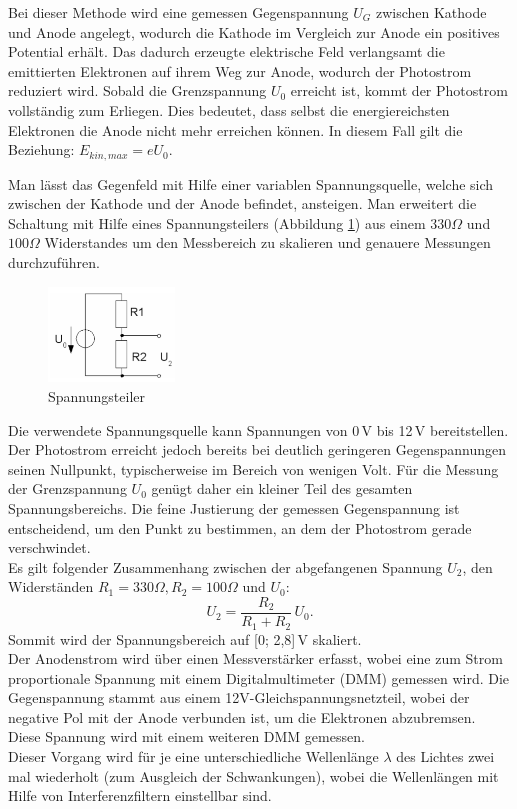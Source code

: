 Bei dieser Methode wird eine gemessen Gegenspannung $U_G$ zwischen Kathode und Anode angelegt, wodurch die Kathode im Vergleich zur Anode ein positives Potential erhält.
Das dadurch erzeugte elektrische Feld verlangsamt die emittierten Elektronen auf ihrem Weg zur Anode, wodurch der Photostrom reduziert wird. Sobald die Grenzspannung $U_0$ erreicht ist, kommt der Photostrom vollständig zum Erliegen. 
Dies bedeutet, dass selbst die energiereichsten Elektronen die Anode nicht mehr erreichen können. In diesem Fall gilt die Beziehung: 
$E_{kin,max} = eU_0$.

Man lässt das Gegenfeld mit Hilfe einer variablen Spannungsquelle, welche sich zwischen der Kathode und der Anode befindet, ansteigen.
Man erweitert die Schaltung mit Hilfe eines Spannungsteilers (Abbildung \ref{fig:spannungsteiler}) aus einem $330\Omega$ und $100\Omega$ Widerstandes um den Messbereich zu skalieren und genauere Messungen durchzuführen.
\begin{figure}[htbp]
    \centering
    \includegraphics[width=0.3\textwidth]{figs/Spannungsteiler.png}
    \caption{ Spannungsteiler \cite{Spannungsteiler}}
    \label{fig:spannungsteiler}
\end{figure}
\FloatBarrier
Die verwendete Spannungsquelle kann Spannungen von 0\,V bis 12\,V bereitstellen. 
Der Photostrom erreicht jedoch bereits bei deutlich geringeren Gegenspannungen seinen Nullpunkt, typischerweise im Bereich von wenigen Volt. 
Für die Messung der Grenzspannung $U_0$ genügt daher ein kleiner Teil des gesamten Spannungsbereichs. 
Die feine Justierung der gemessen Gegenspannung ist entscheidend, um den Punkt zu bestimmen, an dem der Photostrom gerade verschwindet.\\
Es gilt folgender Zusammenhang zwischen der abgefangenen Spannung $U_2$, den Widerständen $R_1 = 330 \Omega, R_2 = 100 \Omega$ und $U_0$:
\begin{equation}
  U_2 = \frac{R_2}{R_1 + R_2}\,U_0.
\end{equation}
Sommit wird der Spannungsbereich auf [0; 2{,}8]\,V skaliert.\\

Der Anodenstrom wird über einen Messverstärker erfasst, 
wobei eine zum Strom proportionale Spannung mit einem 
Digitalmultimeter (DMM) gemessen wird. Die Gegenspannung 
stammt aus einem 12V-Gleichspannungsnetzteil, 
wobei der negative Pol mit der Anode verbunden ist, 
um die Elektronen abzubremsen. Diese Spannung wird 
mit einem weiteren DMM gemessen.\\
Dieser Vorgang wird für je eine unterschiedliche Wellenlänge
$\lambda$ des Lichtes zwei mal wiederholt (zum Ausgleich der Schwankungen), wobei die
Wellenlängen mit Hilfe von Interferenzfiltern
einstellbar sind.


